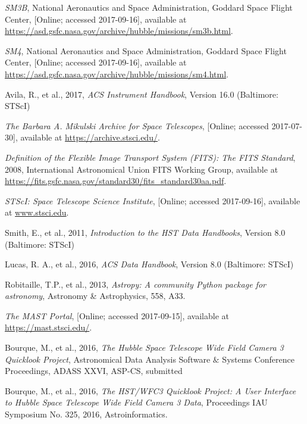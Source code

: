 \documentclass[10pt,journal,compsoc]{IEEEtran}
\begin{document}
\begin{thebibliography}{1}

\emph{SM3B}, National Aeronautics and Space Administration, Goddard Space Flight Center,
[Online; accessed 2017-09-16], available at \textcolor{blue}{\url{https://asd.gsfc.nasa.gov/archive/hubble/missions/sm3b.html}}.

\emph{SM4}, National Aeronautics and Space Administration, Goddard Space Flight Center,
[Online; accessed 2017-09-16], available at \textcolor{blue}{\url{https://asd.gsfc.nasa.gov/archive/hubble/missions/sm4.html}}.

Avila, R., et al., 2017, \emph{ACS Instrument Handbook}, Version 16.0 (Baltimore: STScI)

\emph{The Barbara A. Mikulski Archive for Space Telescopes}, [Online; accessed 2017-07-30],
available at \textcolor{blue}{\url{https://archive.stsci.edu/}}.

\emph{Definition of the Flexible Image Transport System (FITS): The FITS Standard}, 2008,
International Astronomical Union FITS Working Group, available at
\textcolor{blue}{\url{https://fits.gsfc.nasa.gov/standard30/fits_standard30aa.pdf}}.

\emph{STScI: Space Telescope Science Institute}, [Online; accessed 2017-09-16], available at \textcolor{blue}{\url{www.stsci.edu}}.

Smith, E., et al., 2011, \emph{Introduction to the HST Data Handbooks}, Version 8.0 (Baltimore: STScI)

Lucas, R. A., et al., 2016, \emph{ACS Data Handbook}, Version 8.0 (Baltimore: STScI)

Robitaille, T.P., et al., 2013, \emph{Astropy: A community Python package for astronomy},
Astronomy \& Astrophysics, 558, A33.

\emph{The MAST Portal}, [Online; accessed 2017-09-15], available at \textcolor{blue}{\url{https://mast.stsci.edu/}}.

Bourque, M., et al., 2016, \emph{The Hubble Space Telescope Wide Field Camera 3 Quicklook Project},
Astronomical Data Analysis Software $\&$ Systems Conference Proceedings, ADASS XXVI, ASP-CS, submitted

Bourque, M., et al., 2016, \emph{The HST/WFC3 Quicklook Project: A User Interface to Hubble
Space Telescope Wide Field Camera 3 Data}, Proceedings IAU Symposium No. 325, 2016, Astroinformatics.


\end{thebibliography}
\end{document}
